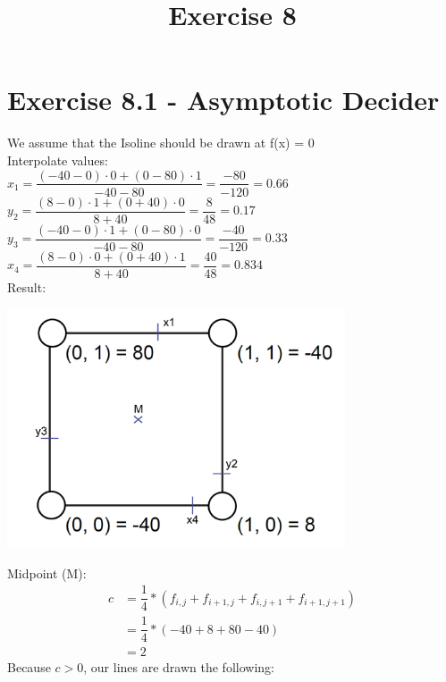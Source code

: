 \documentclass[a4paper]{article}
\date{}
\author{}
\title{Exercise 8}
\begin{document}
\maketitle 
\thispagestyle{fancy}


\section*{Exercise 8.1 - Asymptotic Decider}
We assume that the Isoline should be drawn at f(x) = 0 \\ \linebreak
Interpolate values: \\
$x_{1} = \dfrac{(-40 - 0) \cdot 0 + (0 - 80) \cdot 1}{-40 - 80}  = \dfrac{-80}{-120} = 0.66$\\
$y_{2} = \dfrac{(8 - 0) \cdot 1 + (0 + 40) \cdot 0}{8 + 40} = \dfrac{8}{48} = 0.17$ \\
$y_{3} = \dfrac{(-40 - 0) \cdot 1 + (0 - 80) \cdot 0}{-40 - 80} = \dfrac{-40}{-120} = 0.33 $\\
$x_{4} = \dfrac{(8 - 0) \cdot 0 + (0 + 40) \cdot 1}{8 + 40} = \dfrac{40}{48} = 0.834$ \\ \linebreak
Result: \\
\begin{center}
	\includegraphics[width=10cm]{8T1_1.png}
\end{center}
Midpoint (M):
\begin{align*}
	c &= \dfrac{1}{4}*(f_{i,j} + f_{i+1,j} + f_{i,j+1} + f_{i+1,j+1})\\
	&= \dfrac{1}{4}*(-40 + 8 + 80 -40)\\
	&= 2
\end{align*}
\newpage
Because $ c > 0 $, our lines are drawn the following:\\
\end{document}
